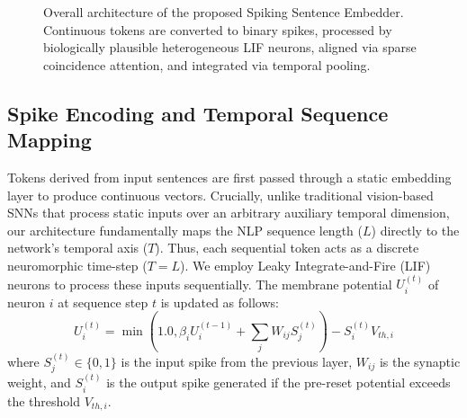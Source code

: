 \documentclass{article} %
\begin{document}
\begin{figure}[h]
\begin{center}
\end{center}
\caption{Overall architecture of the proposed Spiking Sentence Embedder. Continuous tokens are converted to binary spikes, processed by biologically plausible heterogeneous LIF neurons, aligned via sparse coincidence attention, and integrated via temporal pooling.}
\label{fig:architecture}
\end{figure}

\subsection{Spike Encoding and Temporal Sequence Mapping}
Tokens derived from input sentences are first passed through a static embedding layer to produce continuous vectors. Crucially, unlike traditional vision-based SNNs that process static inputs over an arbitrary auxiliary temporal dimension, our architecture fundamentally maps the NLP sequence length ($L$) directly to the network's temporal axis ($T$). Thus, each sequential token acts as a discrete neuromorphic time-step ($T = L$). We employ Leaky Integrate-and-Fire (LIF) neurons to process these inputs sequentially. The membrane potential $U_i^{(t)}$ of neuron $i$ at sequence step $t$ is updated as follows:
\begin{equation}
U_i^{(t)} = \min\left(1.0, \beta_i U_i^{(t-1)} + \sum_{j} W_{ij} S_j^{(t)}\right) - S_i^{(t)} V_{th, i}
\end{equation}
where $S_j^{(t)} \in \{0, 1\}$ is the input spike from the previous layer, $W_{ij}$ is the synaptic weight, and $S_i^{(t)}$ is the output spike generated if the pre-reset potential exceeds the threshold $V_{th, i}$. 
\end{document}
